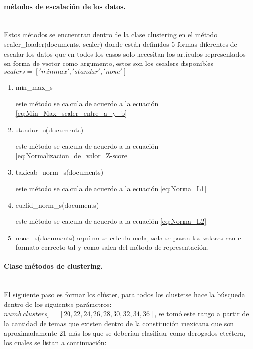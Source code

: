 \documentclass[12pt]{article}
\newcommand{\subsubsubsection}[1]{\paragraph{#1}\mbox{}\\}
\begin{document}
			\subsubsubsection{métodos de escalación de los datos.}
			Estos métodos se encuentran dentro de la clase clustering en el método scaler\_loader(documents, scaler) donde están definidos 5 formas diferentes de escalar los datos que en todos los casos solo necesitan los artículos representados en forma de vector como argumento, estos son los cscalers disponibles $scalers =  ['minmax', 'standar', 'none']$

			\begin{enumerate}
				\item min\_max\_s
				
				este método se calcula de acuerdo a la ecuación \ref{eq:Min_Max_scaler_entre_a_y_b}
				
				\item standar\_s(documents)
				
				este método se calcula de acuerdo a la ecuación \ref{eq:Normalizacion_de_valor_Z-score}
				
				\item taxicab\_norm\_s(documents)
				
				este método se calcula de acuerdo a la ecuación \ref{eq:Norma_L1}
							
				\item euclid\_norm\_s(documents)
				
				este método se calcula de acuerdo a la ecuación \ref{eq:Norma_L2}
							
				\item none\_s(documents)
				aquí no se calcula nada, solo se pasan los valores con el formato correcto tal y como salen del método de representación.
			
			\end{enumerate}			
				
			\subsubsubsection{Clase métodos de clustering.}
			El siguiente paso es formar los clúster, para todos los clusterse hace la búsqueda dentro de los siguientes parámetros: $numb\_clusters_s = [20,22,24,26,28,30,32,34,36]$, se tomó este rango a partir de la cantidad de temas que existen dentro de la constitución mexicana que son aproximadamente 21 más los que se deberían clasificar como derogados etcétera, los cuales se listan a continuación:
			
\end{document}
